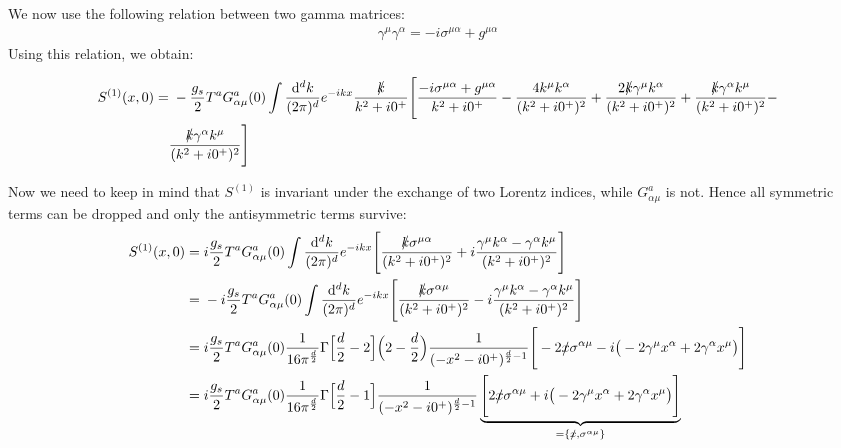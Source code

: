 \documentclass[openright,twoside,12pt,a4paper,final]{article}
\begin{document}
	We now use the following relation between two gamma matrices:
	\begin{align}
		\gamma^{\mu} \gamma^{\alpha} = -i \sigma^{\mu \alpha} + g^{\mu \alpha}
	\end{align}
	Using this relation, we obtain:
	\begin{footnotesize}
	\begin{align}
		S^{(1)}(x,0) =& \;-\frac{g_s}{2} T^a G^a_{\alpha \mu}(0) \int \frac{\mathrm{d}^d k}{(2 \pi)^d} e^{-ikx} \frac{\slashed{k}}{k^2 + i0^+} \Bigg[ \frac{-i \sigma^{\mu \alpha} + g^{\mu \alpha}}{k^2 + i0^+} - \frac{4 k^{\mu} k^{\alpha}}{(k^2 + i0^+)^2} + \frac{2 \slashed{k} \gamma^{\mu} k^{\alpha}}{(k^2 + i0^+)^2} +  \frac{ \slashed{k} \gamma^{\alpha} k^{\mu}}{(k^2 + i0^+)^2} -  \\& \frac{ \slashed{k} \gamma^{\alpha} k^{\mu}}{(k^2 + i0^+)^2} \Bigg] \nonumber
	\end{align}
	\end{footnotesize} \normalsize
	\noindent
	Now we need to keep in mind that $S^{(1)}$ is invariant under the exchange of two Lorentz indices, while $G^a_{\alpha \mu}$ is not. Hence all symmetric terms can be dropped and only the antisymmetric terms survive:
	\begin{align}
		S^{(1)}(x,0) =& \; i \frac{g_s}{2} T^a G^a_{\alpha \mu}(0) \int \frac{\mathrm{d}^d k}{(2 \pi)^d} e^{-ikx} \Bigg[ \frac{\slashed{k} \sigma^{\mu \alpha}}{(k^2 + i0^+)^2} + i\frac{ \gamma^{\mu} k^{\alpha} - \gamma^{\alpha} k^{\mu}}{(k^2 + i0^+)^2} \Bigg] \nonumber \\ =& \;- i \frac{g_s}{2} T^a G^a_{\alpha \mu}(0) \int \frac{\mathrm{d}^d k}{(2 \pi)^d} e^{-ikx} \Bigg[ \frac{\slashed{k} \sigma^{ \alpha \mu}}{(k^2 + i0^+)^2} - i\frac{ \gamma^{\mu} k^{\alpha} - \gamma^{\alpha} k^{\mu}}{(k^2 + i0^+)^2} \Bigg] \nonumber \\ =& \; i \frac{g_s}{2} T^a G^a_{\alpha \mu}(0) \frac{1}{16 \pi^\frac{d}{2}} \Gamma\Big[\frac{d}{2} - 2\Big] \Big(2 - \frac{d}{2}\Big) \frac{1}{(-x^2 - i0^+)^{\frac{d}{2} - 1}} \Bigg[ -2\slashed{x} \sigma^{ \alpha \mu} - i\big( -2 \gamma^{\mu} x^{\alpha} +2 \gamma^{\alpha} x^{\mu}\big) \Bigg] \nonumber \\ =& \; i \frac{g_s}{2} T^a G^a_{\alpha \mu}(0) \frac{1}{16 \pi^\frac{d}{2}} \Gamma\Big[\frac{d}{2} - 1\Big]  \frac{1}{(-x^2 - i0^+)^{\frac{d}{2} - 1}} \underbrace{\Bigg[ 2\slashed{x} \sigma^{ \alpha \mu} + i \big(- 2 \gamma^{\mu} x^{\alpha} + 2 \gamma^{\alpha} x^{\mu}\big) \Bigg]}_{ = \{\slashed{x},\sigma^{\alpha \mu}\}} \nonumber
	\end{align}\\
\end{document}
